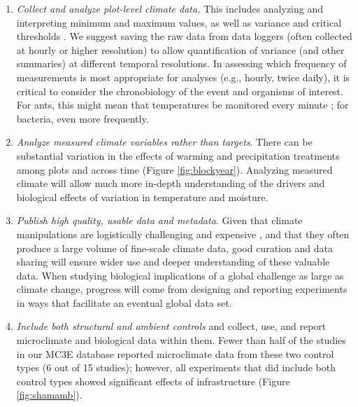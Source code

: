 \documentclass{article}
\begin{document}
\begin{enumerate}
\item\textit{Collect and analyze plot-level climate data.} This includes analyzing and interpreting minimum and maximum values, as well as variance and critical thresholds \citep[e.g., the number and duration of freeze-thaw events and accumulated chilling hours,][]{mcdaniel2014,vasseur2014}. We suggest saving the raw data from data loggers (often collected at hourly or higher resolution) to allow quantification of variance (and other summaries) at different temporal resolutions. In assessing which frequency of measurements is most appropriate for analyses (e.g., hourly, twice daily), it is critical to consider the chronobiology of the event and organisms of interest. For ants, this might mean that temperatures be monitored every minute \citep{shavit2017}; for bacteria, even more frequently. 
\item\textit{Analyze measured climate variables rather than targets}. There can be substantial variation in the effects of warming and precipitation treatments among plots and across time (Figure \ref{fig:blockyear}). Analyzing measured climate will allow much more in-depth understanding of the drivers and biological effects of variation in temperature and moisture.
\item\textit{Publish high quality, usable data and metadata}. Given that climate manipulations are logistically challenging and expensive \citep{aronson2009}, and that they often produce a large volume of fine-scale climate data, good curation and data sharing will ensure wider use and deeper understanding of these valuable data. When studying biological implications of a global challenge as large as climate change, progress will come from designing and reporting experiments in ways that facilitate an eventual global data set. %
\item\textit{Include both structural and ambient controls} and collect, use, and report microclimate and biological data within them. Fewer than half of the studies in our MC3E database reported microclimate data from these two control types (6 out of 15 studies); however, all experiments that did include both control types showed significant effects of infrastructure (Figure \ref{fig:shamamb}). %

\end{enumerate}
\end{document}
